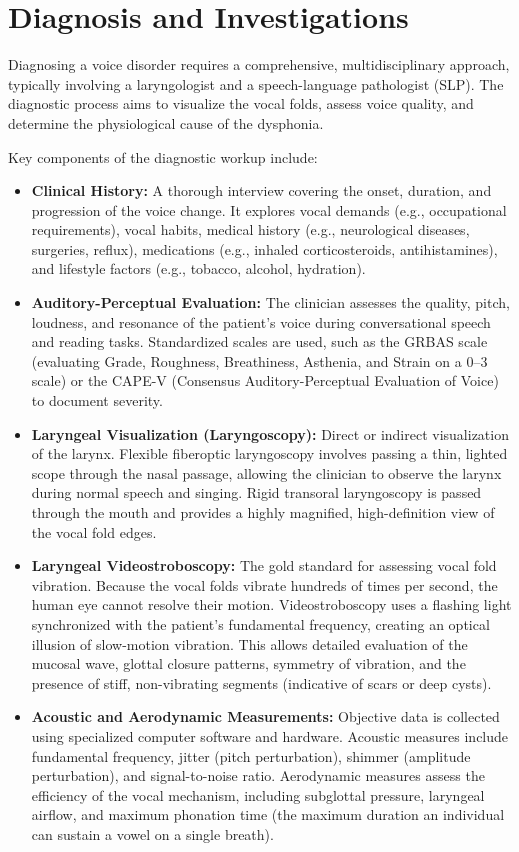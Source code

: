 \section*{Diagnosis and Investigations}
Diagnosing a voice disorder requires a comprehensive, multidisciplinary approach, typically involving a laryngologist and a speech-language pathologist (SLP). The diagnostic process aims to visualize the vocal folds, assess voice quality, and determine the physiological cause of the dysphonia.

Key components of the diagnostic workup include:
\begin{itemize}
    \item \textbf{Clinical History:} A thorough interview covering the onset, duration, and progression of the voice change. It explores vocal demands (e.g., occupational requirements), vocal habits, medical history (e.g., neurological diseases, surgeries, reflux), medications (e.g., inhaled corticosteroids, antihistamines), and lifestyle factors (e.g., tobacco, alcohol, hydration).
    \item \textbf{Auditory-Perceptual Evaluation:} The clinician assesses the quality, pitch, loudness, and resonance of the patient's voice during conversational speech and reading tasks. Standardized scales are used, such as the GRBAS scale (evaluating Grade, Roughness, Breathiness, Asthenia, and Strain on a 0--3 scale) or the CAPE-V (Consensus Auditory-Perceptual Evaluation of Voice) to document severity.
    \item \textbf{Laryngeal Visualization (Laryngoscopy):} Direct or indirect visualization of the larynx. Flexible fiberoptic laryngoscopy involves passing a thin, lighted scope through the nasal passage, allowing the clinician to observe the larynx during normal speech and singing. Rigid transoral laryngoscopy is passed through the mouth and provides a highly magnified, high-definition view of the vocal fold edges.
    \item \textbf{Laryngeal Videostroboscopy:} The gold standard for assessing vocal fold vibration. Because the vocal folds vibrate hundreds of times per second, the human eye cannot resolve their motion. Videostroboscopy uses a flashing light synchronized with the patient's fundamental frequency, creating an optical illusion of slow-motion vibration. This allows detailed evaluation of the mucosal wave, glottal closure patterns, symmetry of vibration, and the presence of stiff, non-vibrating segments (indicative of scars or deep cysts).
    \item \textbf{Acoustic and Aerodynamic Measurements:} Objective data is collected using specialized computer software and hardware. Acoustic measures include fundamental frequency, jitter (pitch perturbation), shimmer (amplitude perturbation), and signal-to-noise ratio. Aerodynamic measures assess the efficiency of the vocal mechanism, including subglottal pressure, laryngeal airflow, and maximum phonation time (the maximum duration an individual can sustain a vowel on a single breath).

\end{itemize}
